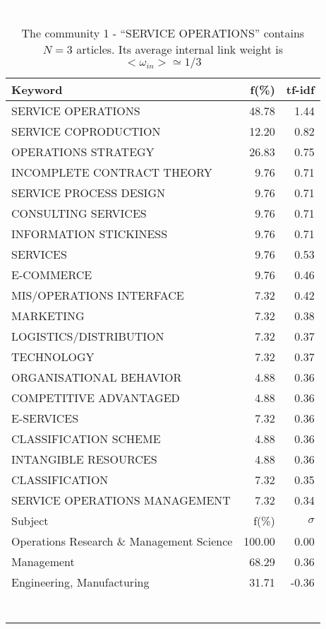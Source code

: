 \documentclass[a4paper,11pt]{report}
\begin{document}
\begin{landscape}
\begin{table}[!ht]
\caption{The community 1 - ``SERVICE OPERATIONS'' contains $N = 3$ articles. Its average internal link weight is $<\omega_{in}> \simeq 1/3$ }
\textcolor{white}{aa}\\
{\scriptsize\begin{tabular}{|l r  r|}
\hline
Keyword & f(\%) & tf-idf \\
\hline
SERVICE OPERATIONS & 48.78 & 1.44\\
SERVICE COPRODUCTION & 12.20 & 0.82\\
OPERATIONS STRATEGY & 26.83 & 0.75\\
INCOMPLETE CONTRACT THEORY & 9.76 & 0.71\\
SERVICE PROCESS DESIGN & 9.76 & 0.71\\
CONSULTING SERVICES & 9.76 & 0.71\\
INFORMATION STICKINESS & 9.76 & 0.71\\
SERVICES & 9.76 & 0.53\\
E-COMMERCE & 9.76 & 0.46\\
MIS/OPERATIONS INTERFACE & 7.32 & 0.42\\
MARKETING & 7.32 & 0.38\\
LOGISTICS/DISTRIBUTION & 7.32 & 0.37\\
TECHNOLOGY & 7.32 & 0.37\\
ORGANISATIONAL BEHAVIOR & 4.88 & 0.36\\
COMPETITIVE ADVANTAGED & 4.88 & 0.36\\
E-SERVICES & 7.32 & 0.36\\
CLASSIFICATION SCHEME & 4.88 & 0.36\\
INTANGIBLE RESOURCES & 4.88 & 0.36\\
CLASSIFICATION & 7.32 & 0.35\\
SERVICE OPERATIONS MANAGEMENT & 7.32 & 0.34\\
\hline
\hline
Subject & f(\%) & $\sigma$\\
\hline
Operations Research \& Management Science & 100.00 & 0.00\\
Management & 68.29 & 0.36\\
Engineering, Manufacturing & 31.71 & -0.36\\
 &  & \\
 &  & \\
 &  & \\
 &  & \\
 &  & \\
 &  & \\
 &  & \\

\end{tabular}}
\end{table}
\end{landscape}
\end{document}
